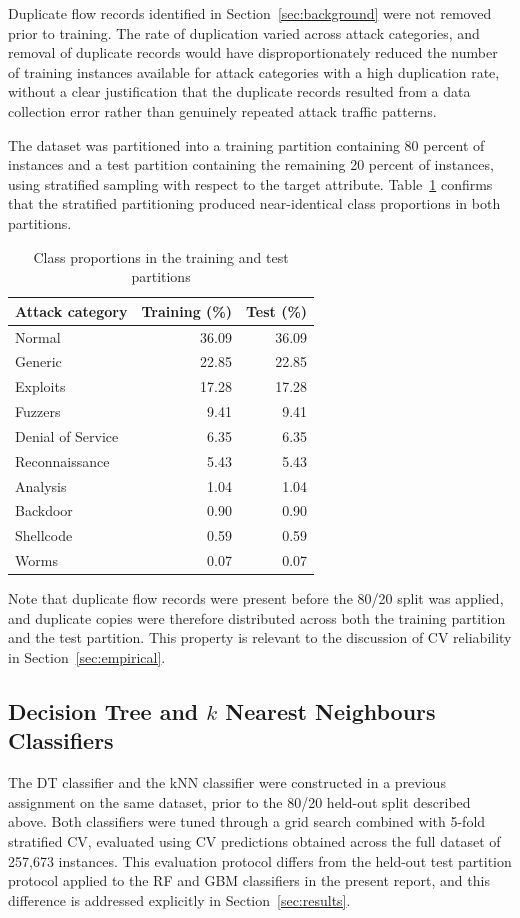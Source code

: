 \documentclass[conference,10pt]{IEEEtran}
\begin{document}
Duplicate flow records identified in Section~\ref{sec:background} were not removed prior to training. The rate of duplication varied across attack categories, and removal of duplicate records would have disproportionately reduced the number of training instances available for attack categories with a high duplication rate, without a clear justification that the duplicate records resulted from a data collection error rather than genuinely repeated attack traffic patterns.

The dataset was partitioned into a training partition containing 80 percent of instances and a test partition containing the remaining 20 percent of instances, using stratified sampling with respect to the target attribute. Table~\ref{tab:split-balance} confirms that the stratified partitioning produced near-identical class proportions in both partitions.

\begin{table}[t]
\caption{Class proportions in the training and test partitions}
\label{tab:split-balance}
\centering
\begin{tabular}{lrr}
\toprule
Attack category & Training (\%) & Test (\%) \\
\midrule
Normal & 36.09 & 36.09 \\
Generic & 22.85 & 22.85 \\
Exploits & 17.28 & 17.28 \\
Fuzzers & 9.41 & 9.41 \\
Denial of Service & 6.35 & 6.35 \\
Reconnaissance & 5.43 & 5.43 \\
Analysis & 1.04 & 1.04 \\
Backdoor & 0.90 & 0.90 \\
Shellcode & 0.59 & 0.59 \\
Worms & 0.07 & 0.07 \\
\bottomrule
\end{tabular}
\end{table}

Note that duplicate flow records were present before the 80/20 split was applied, and duplicate copies were therefore distributed across both the training partition and the test partition. This property is relevant to the discussion of CV reliability in Section~\ref{sec:empirical}.

\subsection{Decision Tree and $k$ Nearest Neighbours Classifiers}
The DT classifier and the kNN classifier were constructed in a previous assignment on the same dataset, prior to the 80/20 held-out split described above. Both classifiers were tuned through a grid search combined with 5-fold stratified CV, evaluated using CV predictions obtained across the full dataset of 257,673 instances. This evaluation protocol differs from the held-out test partition protocol applied to the RF and GBM classifiers in the present report, and this difference is addressed explicitly in Section~\ref{sec:results}.
\end{document}

